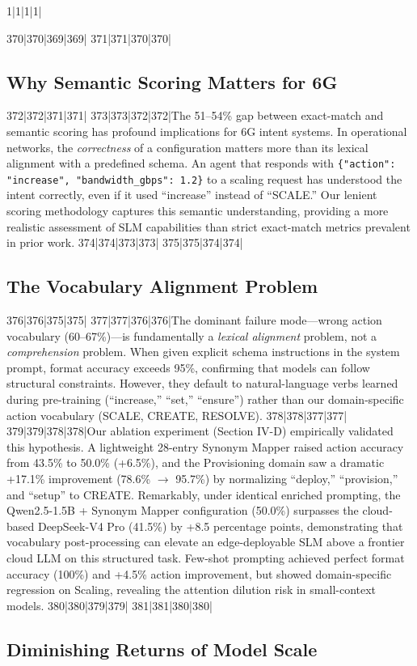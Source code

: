 1|1|1|1|\documentclass[10pt,conference]{IEEEtran}
\begin{document}
370|370|369|369|
371|371|370|370|\subsection{Why Semantic Scoring Matters for 6G}
372|372|371|371|
373|373|372|372|The 51--54\% gap between exact-match and semantic scoring has profound implications for 6G intent systems. In operational networks, the \textit{correctness} of a configuration matters more than its lexical alignment with a predefined schema. An agent that responds with \texttt{\{"action": "increase", "bandwidth\_gbps": 1.2\}} to a scaling request has understood the intent correctly, even if it used ``increase'' instead of ``SCALE.'' Our lenient scoring methodology captures this semantic understanding, providing a more realistic assessment of SLM capabilities than strict exact-match metrics prevalent in prior work.
374|374|373|373|
375|375|374|374|\subsection{The Vocabulary Alignment Problem}
376|376|375|375|
377|377|376|376|The dominant failure mode---wrong action vocabulary (60--67\%)---is fundamentally a \textit{lexical alignment} problem, not a \textit{comprehension} problem. When given explicit schema instructions in the system prompt, format accuracy exceeds 95\%, confirming that models can follow structural constraints. However, they default to natural-language verbs learned during pre-training (``increase,'' ``set,'' ``ensure'') rather than our domain-specific action vocabulary (SCALE, CREATE, RESOLVE). 
378|378|377|377|
379|379|378|378|Our ablation experiment (Section IV-D) empirically validated this hypothesis. A lightweight 28-entry Synonym Mapper raised action accuracy from 43.5\% to 50.0\% (+6.5\%), and the Provisioning domain saw a dramatic +17.1\% improvement (78.6\% $\rightarrow$ 95.7\%) by normalizing ``deploy,'' ``provision,'' and ``setup'' to CREATE. Remarkably, under identical enriched prompting, the Qwen2.5-1.5B + Synonym Mapper configuration (50.0\%) surpasses the cloud-based DeepSeek-V4 Pro (41.5\%) by +8.5 percentage points, demonstrating that vocabulary post-processing can elevate an edge-deployable SLM above a frontier cloud LLM on this structured task. Few-shot prompting achieved perfect format accuracy (100\%) and +4.5\% action improvement, but showed domain-specific regression on Scaling, revealing the attention dilution risk in small-context models.
380|380|379|379|
381|381|380|380|\subsection{Diminishing Returns of Model Scale}
\end{document}
